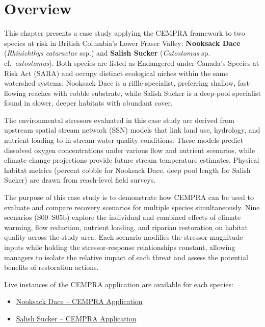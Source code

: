 \documentclass[
  letterpaper,
  DIV=11,
  numbers=noendperiod]{scrreprt}
\providecommand{\tightlist}{%
  \setlength{\itemsep}{0pt}\setlength{\parskip}{0pt}}
\begin{document}

\section*{Overview}\label{overview-1}


This chapter presents a case study applying the CEMPRA framework to two
species at risk in British Columbia's Lower Fraser Valley:
\textbf{Nooksack Dace} (\emph{Rhinichthys cataractae} ssp.) and
\textbf{Salish Sucker} (\emph{Catostomus} sp. cf.~\emph{catostomus}).
Both species are listed as Endangered under Canada's Species at Risk Act
(SARA) and occupy distinct ecological niches within the same watershed
systems. Nooksack Dace is a riffle specialist, preferring shallow,
fast-flowing reaches with cobble substrate, while Salish Sucker is a
deep-pool specialist found in slower, deeper habitats with abundant
cover.

The environmental stressors evaluated in this case study are derived
from upstream spatial stream network (SSN) models that link land use,
hydrology, and nutrient loading to in-stream water quality conditions.
These models predict dissolved oxygen concentrations under various flow
and nutrient scenarios, while climate change projections provide future
stream temperature estimates. Physical habitat metrics (percent cobble
for Nooksack Dace, deep pool length for Salish Sucker) are drawn from
reach-level field surveys.

The purpose of this case study is to demonstrate how CEMPRA can be used
to evaluate and compare recovery scenarios for multiple species
simultaneously. Nine scenarios (S00--S05b) explore the individual and
combined effects of climate warming, flow reduction, nutrient loading,
and riparian restoration on habitat quality across the study area. Each
scenario modifies the stressor magnitude inputs while holding the
stressor-response relationships constant, allowing managers to isolate
the relative impact of each threat and assess the potential benefits of
restoration actions.

Live instances of the CEMPRA application are available for each species:

\begin{itemize}
\tightlist
\item
  \href{https://essa.shinyapps.io/CEMPRA_ND/}{Nooksack Dace -- CEMPRA
  Application}
\item
  \href{https://essa.shinyapps.io/CEMPRA_SS/}{Salish Sucker -- CEMPRA
  Application}
\end{itemize}
\end{document}
